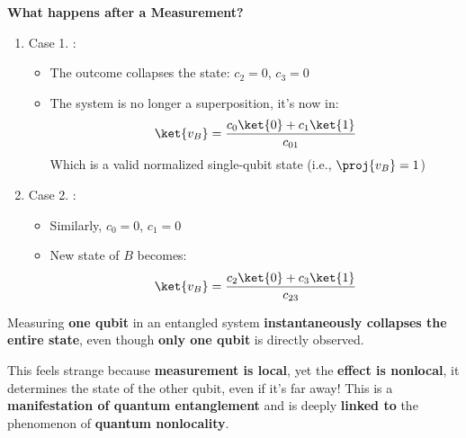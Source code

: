 \highspace
\begin{flushleft}
    \textcolor{Green3}{ \textbf{What happens after a Measurement?}}
\end{flushleft}
\begin{enumerate}
    \item Case 1. :
    \begin{itemize}
        \item The outcome collapses the state: $c_{2} = 0$, $c_{3} = 0$
        \item The system is no longer a superposition, it's now in:
        \begin{equation*}
            \ket{v_{B}} = \dfrac{c_{0}\ket{0} + c_{1}\ket{1}}{c_{01}}
        \end{equation*}
        Which is a valid normalized single-qubit state (i.e., $\proj{v_{B}} = 1$)
    \end{itemize}

    \item Case 2. :
    \begin{itemize}
        \item Similarly, $c_{0} = 0$, $c_{1} = 0$
        \item New state of $B$ becomes:
        \begin{equation*}
            \ket{v_{B}} = \dfrac{c_{2} \ket{0} + c_{3}\ket{1}}{c_{23}}
        \end{equation*}
    \end{itemize}
\end{enumerate}
Measuring \textbf{one qubit} in an entangled system \textbf{instantaneously collapses the entire state}, even though \textbf{only one qubit} is directly observed.

\highspace
This feels strange because \textbf{measurement is local}, yet the \textbf{effect is nonlocal}, it determines the state of the other qubit, even if it's far away! This is a \textbf{manifestation of quantum entanglement} and is deeply \textbf{linked to} the phenomenon of \textbf{quantum nonlocality}.

